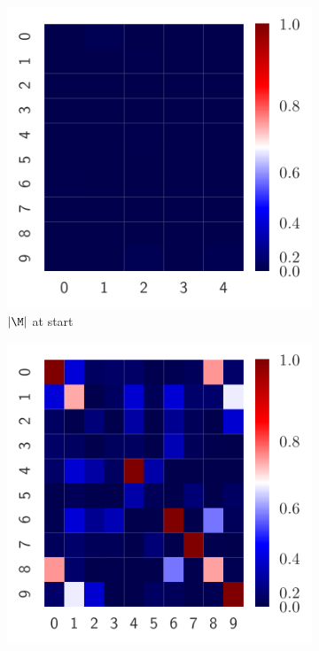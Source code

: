 \begin{figure}
\begin{subfigure}{0.495\textwidth}
    \includegraphics[width=1.\textwidth]{figures/simulation_examples_M_start.pdf}
    \caption{\(|\M|\) at start}
  \end{subfigure}
  \begin{subfigure}{0.495\textwidth}
    \includegraphics[width=1.\textwidth]{figures/simulation_examples_Q_end.pdf}

\end{subfigure}
\end{figure}
